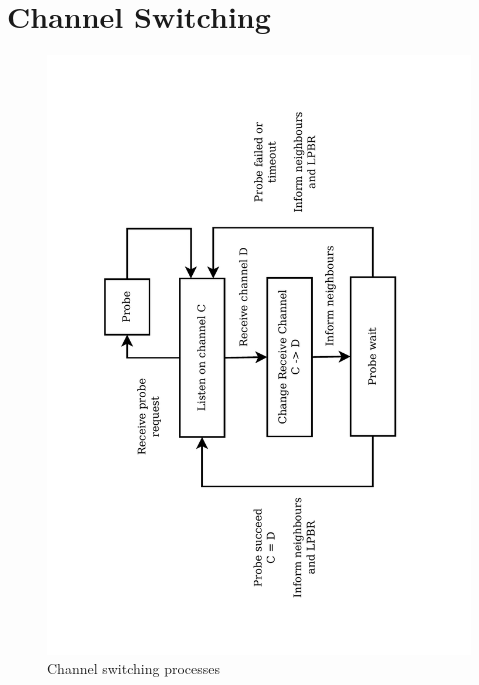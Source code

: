 \section{Channel Switching}

\begin{figure}
\centering
\includegraphics[trim=2cm 2cm 3cm 2cm, clip=true, totalheight=0.6\textheight, angle=270]{channelSwitching.pdf}
\caption{Channel switching processes}
\label{fig_mcrp}
\end{figure}

